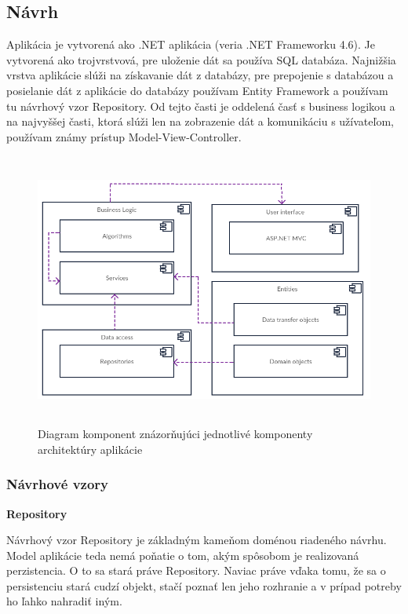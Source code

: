 \documentclass[slovak,master,public,dept460,male,cpdeclaration,oneside]{diploma}
\begin{document}
\subsection{Návrh}
Aplikácia je vytvorená ako .NET aplikácia (veria .NET Frameworku 4.6). Je vytvorená ako trojvrstvová, pre uloženie dát sa používa SQL databáza. Najnižšia vrstva aplikácie slúži na získavanie dát z databázy, pre prepojenie s databázou a posielanie dát z aplikácie do databázy používam Entity Framework a používam tu návrhový vzor Repository. Od tejto časti je oddelená časť s business logikou a na najvyššej časti, ktorá slúži len na zobrazenie dát a komunikáciu s užívateľom, používam známy prístup Model-View-Controller.


\begin{figure}[H]
\centering
\includegraphics[width=15cm, height=9cm]{figures/diagram_komponent}
\caption{Diagram komponent znázorňujúci jednotlivé komponenty architektúry aplikácie}
\end{figure}

\subsubsection{Návrhové vzory}

\noindent \textbf{Repository} \cite{11}

Návrhový vzor Repository je základným kameňom doménou riadeného návrhu. Model aplikácie teda nemá poňatie o tom, akým spôsobom je realizovaná perzistencia. O to sa stará práve Repository. Naviac práve vďaka tomu, že sa o persistenciu stará cudzí objekt, stačí poznať len jeho rozhranie a v prípad potreby ho ľahko nahradiť iným. 
\end{document}

